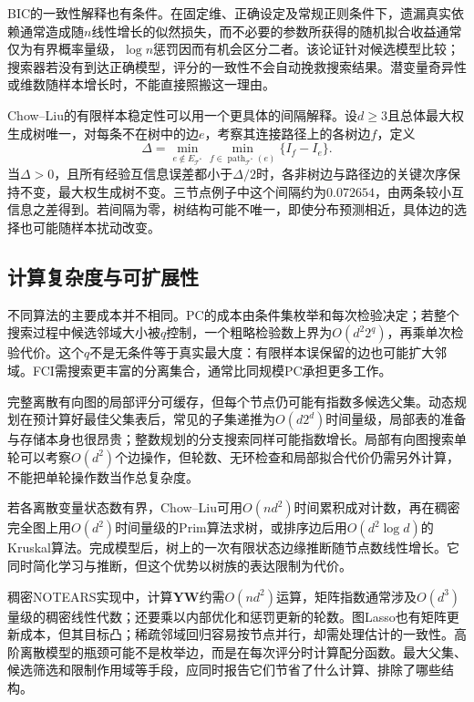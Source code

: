 BIC的一致性解释也有条件。在固定维、正确设定及常规正则条件下，遗漏真实依赖通常造成随$n$线性增长的似然损失，而不必要的参数所获得的随机拟合收益通常仅为有界概率量级，$\log n$惩罚因而有机会区分二者。该论证针对候选模型比较；搜索器若没有到达正确模型，评分的一致性不会自动挽救搜索结果。潜变量奇异性或维数随样本增长时，不能直接照搬这一理由。

Chow--Liu的有限样本稳定性可以用一个更具体的间隔解释。设$d\geq3$且总体最大权生成树唯一，对每条不在树中的边$e$，考察其连接路径上的各树边$f$，定义
\[
  \Delta=\min_{e\notin E_{\mathcal{T}^{*}}}
             \min_{f\in\operatorname{path}_{\mathcal{T}^{*}}(e)}
             \{I_f-I_e\}.
\]
当$\Delta>0$，且所有经验互信息误差都小于$\Delta/2$时，各非树边与路径边的关键次序保持不变，最大权生成树不变。三节点例子中这个间隔约为$0.072654$，由两条较小互信息之差得到。若间隔为零，树结构可能不唯一，即使分布预测相近，具体边的选择也可能随样本扰动改变。

\subsection{计算复杂度与可扩展性}
\label{sec:pgm-structure-learning-complexity}

不同算法的主要成本并不相同。PC的成本由条件集枚举和每次检验决定；若整个搜索过程中候选邻域大小被$q$控制，一个粗略检验数上界为$O(d^2 2^q)$，再乘单次检验代价。这个$q$不是无条件等于真实最大度：有限样本误保留的边也可能扩大邻域。FCI需搜索更丰富的分离集合，通常比同规模PC承担更多工作。

完整离散有向图的局部评分可缓存，但每个节点仍可能有指数多候选父集。动态规划在预计算好最佳父集表后，常见的子集递推为$O(d2^d)$时间量级，局部表的准备与存储本身也很昂贵；整数规划的分支搜索同样可能指数增长。局部有向图搜索单轮可以考察$O(d^2)$个边操作，但轮数、无环检查和局部拟合代价仍需另外计算，不能把单轮操作数当作总复杂度。

若各离散变量状态数有界，Chow--Liu可用$O(nd^2)$时间累积成对计数，再在稠密完全图上用$O(d^2)$时间量级的Prim算法求树，或排序边后用$O(d^2\log d)$的Kruskal算法。完成模型后，树上的一次有限状态边缘推断随节点数线性增长。它同时简化学习与推断，但这个优势以树族的表达限制为代价。

稠密NOTEARS实现中，计算$\bm{Y}\bm{W}$约需$O(nd^2)$运算，矩阵指数通常涉及$O(d^3)$量级的稠密线性代数；还要乘以内部优化和惩罚更新的轮数。图Lasso也有矩阵更新成本，但其目标凸；稀疏邻域回归容易按节点并行，却需处理估计的一致性。高阶离散模型的瓶颈可能不是枚举边，而是在每次评分时计算配分函数。最大父集、候选筛选和限制作用域等手段，应同时报告它们节省了什么计算、排除了哪些结构。

